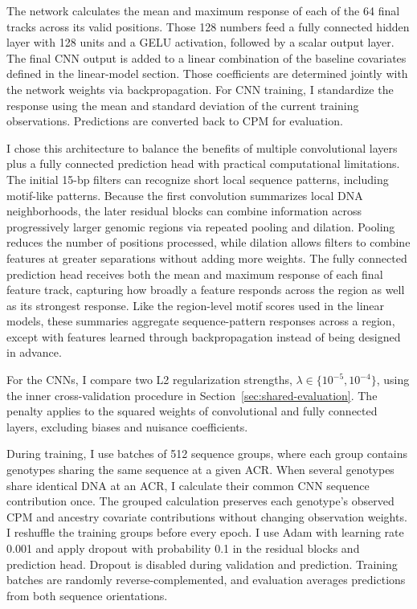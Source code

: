 \documentclass[10pt]{article}
\begin{document}
The network calculates the mean and maximum response of each of
the 64 final tracks across its valid positions. Those 128 numbers
feed a fully connected hidden layer with 128 units and a GELU
activation, followed by a scalar output layer. The final CNN
output is added to a linear combination of the baseline covariates
defined in the linear-model section. Those coefficients are
determined jointly with the network weights via backpropagation.
For CNN training, I standardize the response using the mean and
standard deviation of the current training observations. Predictions
are converted back to CPM for evaluation.

I chose this architecture to balance the benefits of multiple
convolutional layers plus a fully connected prediction head with
practical computational limitations. The initial 15-bp filters
can recognize short local sequence patterns, including motif-like
patterns. Because the first convolution summarizes
local DNA neighborhoods, the later residual blocks can combine
information across progressively larger genomic regions via repeated pooling and dilation. Pooling
reduces the number of positions processed, while dilation allows
filters to combine features at greater separations without adding
more weights. The fully connected prediction head receives both
the mean and maximum response of each final feature track,
capturing how broadly a feature responds across the region as well as its strongest response. Like the region-level motif scores used in the linear models,
these summaries aggregate sequence-pattern responses across a
region, except with features learned through backpropagation instead of being designed in advance. 

For the CNNs, I compare two L2 regularization strengths,
$\lambda\in\{10^{-5},10^{-4}\}$, using the inner cross-validation
procedure in Section~\ref{sec:shared-evaluation}. The penalty applies
to the squared weights of convolutional and fully connected layers,
excluding biases and nuisance coefficients.

During training, I use batches of 512 sequence groups, where each
group contains genotypes sharing the same sequence at a given ACR.
When several genotypes share identical DNA at an ACR, I calculate
their common CNN sequence contribution once. The grouped calculation preserves each genotype's observed CPM
and ancestry covariate contributions without changing observation
weights. I reshuffle the training groups
before every epoch. I use Adam with learning rate 0.001 and apply
dropout with probability 0.1 in the residual blocks and prediction
head. Dropout is disabled during validation and prediction.
Training batches are randomly reverse-complemented, and evaluation
averages predictions from both sequence orientations.
\end{document}
